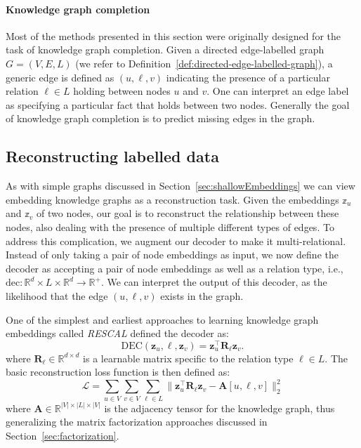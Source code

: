 \paragraph{Knowledge graph completion}
Most of the methods presented in this section were originally designed for the task of knowledge graph completion. Given a directed edge-labelled graph $G=(V, E, L)$ (we refer to Definition~\ref{def:directed-edge-labelled-graph}), a generic edge is defined as $(u,\ell,v)$ indicating the presence of a particular relation $\ell \in L$ holding between nodes $u$ and $v$. One can interpret an edge label as specifying a particular fact that holds between two nodes. Generally the goal of knowledge graph completion is to predict missing edges in the graph.

\subsection{Reconstructing labelled data}
As with simple graphs discussed in Section~\ref{sec:shallowEmbeddings} we can view embedding knowledge graphs as a reconstruction task. Given the embeddings $\mathbb{z}_u$ and $\mathbb{z}_v$ of two nodes, our goal is to reconstruct the relationship between these nodes, also dealing with the presence of multiple different types of edges.
To address this complication, we augment our decoder to make it multi-relational. Instead of only taking a pair of node embeddings as input, we now define the decoder as accepting a pair of node embeddings as well as a relation type, i.e., $\text{dec}: \mathbb{R}^d \times L \times \mathbb{R}^d \to \mathbb{R}^+$. We can interpret the output of this decoder, as the likelihood that the edge $(u,\ell,v)$ exists in the graph.

One of the simplest and earliest approaches to learning knowledge graph embeddings called \textit{RESCAL} defined the decoder as:
\begin{equation}\label{eq:RESCAL}
    \text{DEC}(\mathbf{z}_u, \ell, \mathbf{z}_v) = \mathbf{z}_u^\top \mathbf{R}_\ell \mathbf{z}_v.
\end{equation}
where $\mathbf{R}_\ell\in \mathbb{R}^{d\times d}$ is a learnable matrix specific to the relation type $\ell\in L$. The basic reconstruction loss function is then defined as:
\begin{equation}\label{eq:reconstructionLossMulti}
    \mathcal{L} = \sum_{u\in V}\sum_{v\in V}\sum_{\ell\in L} \|\mathbf{z}_u^\top \mathbf{R}_\ell \mathbf{z}_v - \mathbf{A}[u,\ell,v]\|_2^2
\end{equation}
where $\mathbf{A}\in\mathbb{R}^{|V|\times|L|\times|V|}$ is the adjacency tensor for the knowledge graph, thus generalizing the matrix factorization approaches discussed in Section~\ref{sec:factorization}.

